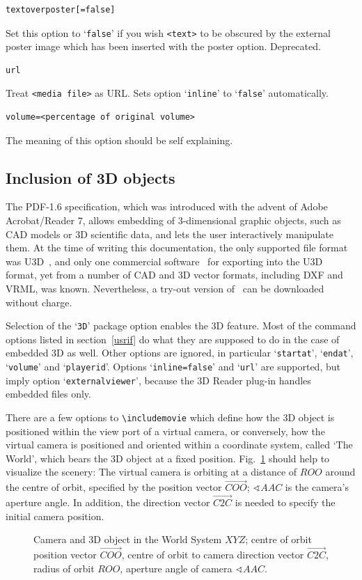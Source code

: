 \documentclass[a4paper]{article}
\begin{document}
\begin{verbatim}
textoverposter[=false]
\end{verbatim}
Set this option to `\verb+false+' if you wish \verb+<text>+ to be obscured by the external poster image which has been inserted with the poster option. Deprecated.
\begin{verbatim}
url
\end{verbatim}
Treat \verb+<media file>+ as URL. Sets option `\verb+inline+' to `\verb+false+' automatically.
\begin{verbatim}
volume=<percentage of original volume>
\end{verbatim}
The meaning of this option should be self explaining.

\subsection{Inclusion of 3D objects}\label{sec:3D}
The PDF-1.6 specification, which was introduced with the advent of Adobe Acrobat/Reader 7, allows embedding of 3-dimensional graphic objects, such as CAD models or 3D scientific data, and lets the user interactively manipulate them. At the time of writing this documentation, the only supported file format was U3D~\cite{3diforg}, and only one commercial software~\cite{dexp} for exporting into the U3D format, yet from a number of CAD and 3D vector formats, including DXF and VRML, was known. Nevertheless, a try-out version of~\cite{dexp} can be downloaded without charge.

Selection of the `\verb+3D+' package option enables the 3D feature. Most of the command options listed in section~\ref{usrif} do what they are supposed to do in the case of embedded 3D as well. Other options are ignored, in particular `\verb+startat+', `\verb+endat+', `\verb+volume+' and `\verb+playerid+'. Options `\verb+inline=false+' and `\verb+url+' are supported, but imply option `{\tt{}ex\-ter\-nal\-view\-er}', because the 3D Reader plug-in handles embedded files only.

There are a few options to \verb+\includemovie+ which define how the 3D object is positioned within the view port of a virtual camera, or conversely, how the virtual camera is positioned and oriented within a coordinate system, called `The World', which bears the 3D object at a fixed position. Fig.~\ref{3dscene} should help to visualize the scenery: The virtual camera is orbiting at a distance of $ROO$ around the centre of orbit, specified by the position vector $\overrightarrow{COO}$; $\sphericalangle AAC$ is the camera's aperture angle. In addition, the direction vector $\overrightarrow{C2C}$ is needed to specify the initial camera position.
\begin{figure}[ht]
  \resizebox{\linewidth}{!}{}
  \caption{Camera and 3D object in the World System $XYZ$; centre of orbit position vector $\vec{COO}$, centre of orbit to camera direction vector $\vec{C2C}$, radius of orbit $ROO$, aperture angle of camera $\sphericalangle AAC$.}\label{3dscene}
\end{figure}
\end{document}
